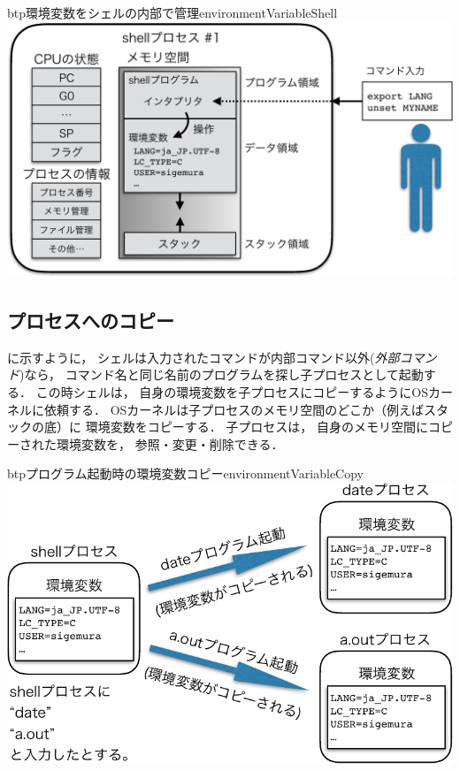 \begin{myfig}{btp}{環境変数をシェルの内部で管理}{environmentVariableShell}
  \includegraphics[scale=0.70]{Fig/environmentVariableShell-crop.pdf}
\end{myfig}

\subsection{プロセスへのコピー}
に示すように，
シェルは入力されたコマンドが内部コマンド以外(\emph{外部コマンド})なら，
コマンド名と同じ名前のプログラムを探し子プロセスとして起動する．
この時シェルは，
自身の環境変数を子プロセスにコピーするようにOSカーネルに依頼する．
OSカーネルは子プロセスのメモリ空間のどこか（例えばスタックの底）に
環境変数をコピーする．
子プロセスは，
自身のメモリ空間にコピーされた環境変数を，
参照・変更・削除できる．

\begin{myfig}{btp}{プログラム起動時の環境変数コピー}{environmentVariableCopy}
  \includegraphics[scale=0.75]{Fig/environmentVariableCopy-crop.pdf}
\end{myfig}

